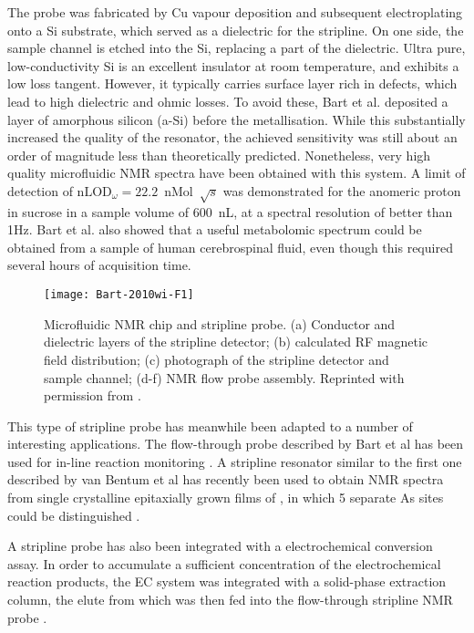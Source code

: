 The probe was fabricated by Cu vapour
deposition and subsequent electroplating onto a Si substrate, which
served as a dielectric for the stripline. On one side, the sample
channel is etched into the Si, replacing a part of the dielectric. Ultra
pure, low-conductivity Si is an excellent insulator at room temperature,
and exhibits a low loss tangent. However, it typically carries surface
layer rich in defects, which lead to high dielectric and ohmic losses.
To avoid these, Bart et al. deposited a layer of amorphous silicon
(a-Si) before the metallisation. While this substantially increased the
quality of the resonator, the achieved sensitivity was still about an
order of magnitude less than theoretically predicted. Nonetheless, very
high quality microfluidic NMR spectra have been obtained with 
this system. A limit of detection of $\text{nLOD}_\omega=22.2$~nMol~$\sqrt{s}$ was
demonstrated for the anomeric proton in sucrose in a sample volume of
600~nL, at a spectral resolution of better than 1Hz. 
Bart et al. also
showed that a useful metabolomic spectrum could be obtained from a
sample of human cerebrospinal fluid, even though this required several
hours of acquisition time. 

\begin{figure}
	\begin{center}
		\texttt{[image: Bart-2010wi-F1]}
	\end{center}
	\caption{Microfluidic NMR chip and stripline probe. (a) Conductor and 
		dielectric layers of the stripline detector; (b) calculated RF magnetic field distribution;
		(c) photograph of the stripline detector and sample channel; (d-f) NMR flow probe assembly.
		Reprinted with permission from \cite{Bart:2010wi}.
		}
	\label{fig-Bart-2010wi}
\end{figure}


This type of stripline probe has meanwhile
been adapted to a number of interesting applications. The flow-through
probe described by Bart et al has been used for in-line reaction
monitoring \cite{Bart:2010wi}. A stripline resonator similar to the first
one described by van Bentum et al \cite{vanBentum:2008jc} has recently been
used to obtain  NMR spectra from single crystalline epitaxially
grown films of , in which 5 separate As sites could be
distinguished \cite{Goswami:2014ha}. 

A stripline probe has also been
integrated with a electrochemical conversion assay. In order to
accumulate a sufficient concentration of the electrochemical reaction
products, the EC system was integrated with a solid-phase extraction
column, the elute from which was then fed into the flow-through
stripline NMR probe \cite{Falck:2013kv,Falck:2015eu}. 

